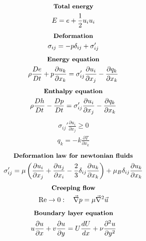 \documentclass[10pt, a4paper]{article}
\begin{document}
\begin{multicols*}{2}
\begin{gather*}
        \textbf{\small Total energy} \\
        E = e + \frac12 u_i u_i
    \end{gather*}
    \begin{gather*}
        \textbf{\small Deformation} \\
        \sigma_{ij} = -p \delta_{ij} + \sigma_{ij}'
    \end{gather*}
    \begin{gather*}
        \textbf{\small Energy equation} \\
        \rho \frac{De}{Dt} + p\frac{\partial u_k}{\partial x_k} =
        \sigma_{ij}' \frac{\partial u_i}{\partial x_j}  - \frac{\partial q_k}{\partial x_k}
    \end{gather*}
    \begin{gather*}
        \textbf{\small Enthalpy equation} \\
        \rho \frac{Dh}{Dt} - \frac{Dp}{Dt} =
        \sigma_{ij}' \frac{\partial u_i}{\partial x_j}  - \frac{\partial q_k}{\partial x_k}
    \end{gather*}
    \begin{gather*}
        \sigma_{ij}' \frac{\partial u_i}{\partial x_j} \geq 0
    \end{gather*}
    \begin{gather*}
        q_k = -k\frac{\partial T}{\partial x_k}
    \end{gather*}
    \begin{gather*}
        \textbf{\small Deformation law for newtonian fluids} \\
        \sigma_{ij}' = \mu \left( \frac{\partial u_i}{\partial x_j} + \frac{\partial u_j}{\partial x_i}
        - \frac23\delta_{ij}\frac{\partial u_k}{\partial x_k} \right) + \mu_B\delta_{ij}\frac{\partial u_k}{\partial x_k}
    \end{gather*}
    \begin{gather*}
        \textbf{\small Creeping flow} \\
        \text{Re} \rightarrow 0: \quad \vec{\nabla}p = \mu \vec{\nabla}^2 \vec{u}
    \end{gather*}
    \begin{gather*}
        \textbf{\small Boundary layer equation} \\
        u\frac{\partial u}{\partial x} + v \frac{\partial u}{\partial y} =
        U \frac{dU}{dx} + \nu \frac{\partial^2 u}{\partial y^2}
    \end{gather*}
    \begin{gather*}

\end{gather*}
\end{multicols*}
\end{document}
